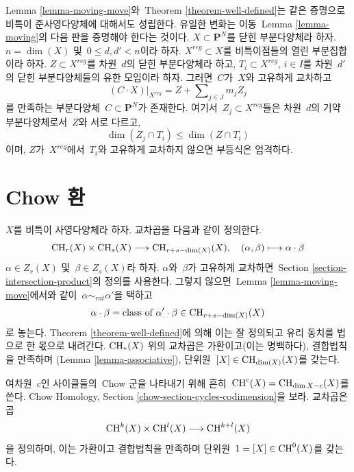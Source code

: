 \begin{remark}
\label{remark-quasi-projective}
Lemma \ref{lemma-moving-move}와\  Theorem \ref{theorem-well-defined}는
같은 증명으로 비특이 준사영다양체에 대해서도 성립한다.
유일한 변화는 이동\  Lemma \ref{lemma-moving}의 다음 판을 증명해야
한다는 것이다. $X \subset \mathbf{P}^N$를 닫힌 부분다양체라 하자.
$n = \dim(X)$ 및\  $0 \leq d, d' < n$이라 하자.
$X^{reg} \subset X$를 비특이점들의 열린 부분집합이라 하자.
$Z \subset X^{reg}$를 차원\  $d$의 닫힌 부분다양체라 하고,
$T_i \subset X^{reg}$, $i \in I$를 차원\  $d'$의 닫힌 부분다양체들의
유한 모임이라 하자. 그러면\  $C$가\  $X$와 고유하게 교차하고
$$
(C \cdot X)|_{X^{reg}} = Z + \sum\nolimits_{j \in J} m_j Z_j
$$
를 만족하는 부분다양체\  $C \subset \mathbf{P}^N$가 존재한다.
여기서\  $Z_j \subset X^{reg}$들은 차원\  $d$의 기약 부분다양체로서\ 
$Z$와 서로 다르고,
$$
\dim(Z_j \cap T_i) \leq \dim(Z \cap T_i)
$$
이며, $Z$가\  $X^{reg}$에서\  $T_i$와 고유하게 교차하지 않으면
부등식은 엄격하다.
\end{remark}



\section{Chow 환}
\label{section-chow-rings}

\noindent
$X$를 비특이 사영다양체라 하자. 교차곱을 다음과 같이 정의한다.
$$
\mathop{\mathrm{CH}}\nolimits_r(X) \times \mathop{\mathrm{CH}}\nolimits_s(X) \longrightarrow \mathop{\mathrm{CH}}\nolimits_{r + s - \dim(X)}(X),\quad
(\alpha, \beta) \longmapsto \alpha \cdot \beta
$$
$\alpha \in Z_r(X)$ 및\  $\beta \in Z_s(X)$라 하자.
$\alpha$와\  $\beta$가 고유하게 교차하면\  Section
\ref{section-intersection-product}의 정의를 사용한다.
그렇지 않으면\  Lemma \ref{lemma-moving-move}에서와 같이\ 
$\alpha \sim_{rat} \alpha'$을 택하고
$$
\alpha \cdot \beta =
\text{class of }\alpha' \cdot \beta \in \mathop{\mathrm{CH}}\nolimits_{r + s - \dim(X)}(X)
$$
로 놓는다. Theorem \ref{theorem-well-defined}에 의해 이는 잘 정의되고
유리 동치를 법으로 한 몫으로 내려간다. $\mathop{\mathrm{CH}}\nolimits_*(X)$ 위의 교차곱은
가환이고(이는 명백하다), 결합법칙을 만족하며
(Lemma \ref{lemma-associative}), 단위원\ 
$[X] \in \mathop{\mathrm{CH}}\nolimits_{\dim(X)}(X)$를 갖는다.

\medskip\noindent
여차원\  $c$인 사이클들의\  Chow 군을 나타내기 위해 흔히\ 
$\mathop{\mathrm{CH}}\nolimits^c(X) = \mathop{\mathrm{CH}}\nolimits_{\dim X - c}(X)$를 쓴다. Chow Homology, Section
\ref{chow-section-cycles-codimension}을 보라. 교차곱은 곱
$$
\mathop{\mathrm{CH}}\nolimits^k(X) \times \mathop{\mathrm{CH}}\nolimits^l(X) \longrightarrow \mathop{\mathrm{CH}}\nolimits^{k + l}(X)
$$
을 정의하며, 이는 가환이고 결합법칙을 만족하며 단위원\ 
$1 = [X] \in \mathop{\mathrm{CH}}\nolimits^0(X)$를 갖는다.



